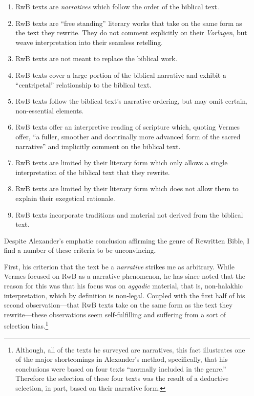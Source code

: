 \begin{enumerate}
\def\labelenumi{\arabic{enumi}.}
\tightlist
\item
  RwB texts are \emph{narratives} which follow the order of the biblical
  text.
\item
  RwB texts are ``free standing'' literary works that take on the same
  form as the text they rewrite. They do not comment explicitly on their
  \emph{Vorlagen}, but weave interpretation into their seamless
  retelling.
\item
  RwB texts are not meant to replace the biblical work.
\item
  RwB texts cover a large portion of the biblical narrative and exhibit
  a ``centripetal'' relationship to the biblical text.
\item
  RwB texts follow the biblical text's narrative ordering, but may omit
  certain, non-essential elements.
\item
  RwB texts offer an interpretive reading of scripture which, quoting
  Vermes offer, ``a fuller, smoother and doctrinally more advanced form
  of the sacred narrative''\autocite[Citing Vermes in][305]{schurer1986}
  and implicitly comment on the biblical text.
\item
  RwB texts are limited by their literary form which only allows a
  single interpretation of the biblical text that they rewrite.
\item
  RwB texts are limited by their literary form which does not allow them
  to explain their exegetical rationale.
\item
  RwB texts incorporate traditions and material not derived from the
  biblical text.
\end{enumerate}

Despite Alexander's emphatic conclusion affirming the genre of
Rewritten Bible, I find a number of these criteria to be unconvincing.

First, his criterion that the text be a \emph{narrative} strikes me as
arbitrary. While Vermes focused on RwB as a narrative phenomenon, he has
since noted that the reason for this was that his focus was on
\emph{aggadic} material, that is, non-halakhic interpretation, which by
definition is non-legal. Coupled with the first half of his second
observation---that RwB texts take on the same form as the text they
rewrite---these observations seem self-fulfilling and suffering from a
sort of selection bias.\footnote{Although, all of the texts he surveyed
  are narratives, this fact illustrates one of the major shortcomings in
  Alexander's method, specifically, that his conclusions were based on
  four texts ``normally included in the
  genre.''\autocite[99]{alexander_carson-williamson1988} Therefore the
  selection of these four texts was the result of a deductive selection,
  in part, based on their narrative form.}

